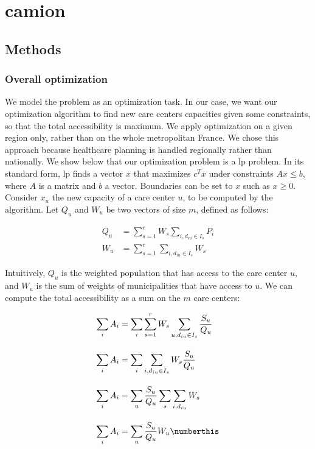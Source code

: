 \chapter{\acf{camion}}

\section{Methods}

\subsection{Overall optimization}

We model the problem as an optimization task. In our case, we want our
optimization algorithm to find new care centers capacities given some
constraints, so that the total accessibility is maximum. We apply optimization
on a given region only, rather than on the whole metropolitan France. We chose
this approach because healthcare planning is handled regionally rather than
nationally. We show below that our optimization problem is a \acf{lp} problem. In
its standard form, \ac{lp} finds a vector $x$ that maximizes $c^T x$ under
constraints $Ax \leq b$, where $A$ is a matrix and $b$ a vector. Boundaries can
be set to $x$ such as $x \geq 0$. Consider $x_u$ the new capacity of a care
center $u$, to be computed by the algorithm. Let $Q_u$ and $W_u$ be two vectors
of size $m$, defined as follows:

\begin{align}
    Q_u & =  \sum_{s=1}^{r} W_s \sum_{i, d_{iu} \in I_s} P_i \\[10pt]
    W_u & =  \sum_{s=1}^{r} \sum_{i, d_{iu} \in I_s} W_s
\end{align}

Intuitively, $Q_u$ is the weighted population that has access to the care center
$u$, and $W_u$ is the sum of weights of municipalities that have access to $u$.
We can compute the total accessibility as a sum on the $m$ care centers:

\begin{align*}
    \sum_{i} A_i & = \sum_{i} \sum_{s=1}^{r} W_s \sum_{u, d_{iu} \in I_s} \frac{S_u}{Q_u} \\[10pt]
    \sum_{i} A_i & = \sum_{i} \sum_{i, d_{iu} \in I_s} W_s \frac{S_u}{Q_u}                \\[10pt]
    \sum_{i} A_i & = \sum_{u} \frac{S_u}{Q_u} \sum_{s} \sum_{i, d_{iu}} W_s               \\[10pt]
    \sum_{i} A_i & = \sum_{u} \frac{S_u}{Q_u} W_u \numberthis \label{eq:A_i_sum_u}
\end{align*}

